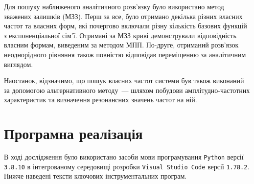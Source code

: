 \documentclass{mathreport}
\begin{document}
Для пошуку наближеного аналітичного розв'язку було використано метод зважених залишків (МЗЗ). Перш за все, було отримано декілька різних власних частот та власних форм, які почергово включали різну кількість базових функцій з експоненціальної сім'ї. Отримані за МЗЗ криві демонстрували відповідність власним формам, виведеним за методом МПП. По-друге, отриманий розв'язок неоднорідного рівняння також повністю відповідав переміщенню за аналітичним виглядом.

Наостанок, відзначимо, що пошук власних частот системи був також виконаний за допомогою альтернативного методу~--- шляхом побудови амплітудно-частотних характеристик та визначення резонансних значень частот на ній.

\newpage
\section{Програмна реалізація}

В ході дослідження було використано засоби мови програмування \texttt{Python} версії \texttt{3.8.10} в інтегрованому середовищі розробки \texttt{Visual Studio Code} версії \texttt{1.78.2}. Нижче наведені тексти ключових інструментальних програм.













\newpage






\end{document}
